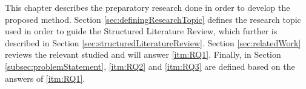 This chapter describes the preparatory research done in order to develop the proposed method. Section \vref{sec:definingResearchTopic} defines the research topic used in order to guide the Structured Literature Review\citep{kofod2014}, which further is described in Section \vref{sec:structuredLiteratureReview}. Section \vref{sec:relatedWork} reviews the relevant studied and will answer \vref{itm:RQ1}. Finally, in Section \vref{subsec:problemStatement}, \vref{itm:RQ2} and \vref{itm:RQ3} are defined based on the answers of \vref{itm:RQ1}.  
